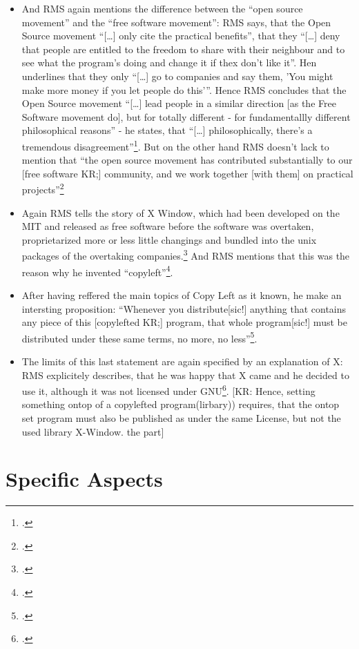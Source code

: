 \documentclass[DIV=calc,BCOR=5mm,11pt,headings=small,oneside,abstract=true, toc=bib]{scrartcl}
\begin{document}
\begin{itemize}
  \item And RMS again mentions the difference between the \enquote{open
  source movement} and the \enquote{free software movement}: RMS says,
  that the Open Source movement \enquote{[\ldots] only cite the practical
  benefits}, that they \enquote{[\ldots] deny that people are
  entitled to the freedom to share with their neighbour and to see what
  the program's doing and change it if thex don't like it}. Hen underlines
  that they only \enquote{[\ldots] go to companies and say them, 'You might
  make more money if you let people do this'}. Hence RMS concludes that
  the Open Source movement \enquote{[\ldots] lead people in a similar direction
  [as the Free Software movement do], but for totally different - for
  fundamentallly different philosophical reasons} - he states, that
  \enquote{[\ldots] philosophically, there's a tremendous
  disagreement}\footcite[cf][167]{Stallman2001a}. But on the other hand
  RMS doesn't lack to mention that \enquote{the open source movement has
  contributed substantially to our [free software KR;] community, and we work
  together [with them] on practical
  projects}\footcite[cf][167]{Stallman2001a}
  \item Again RMS tells the story of X Window, which had been developed on the
  MIT and released as free software before the software was overtaken,
  proprietarized more or less little changings and bundled into the unix
  packages of the overtaking companies.\footcite[cf][168f]{Stallman2001a} And
  RMS mentions that this was the reason why he invented 
  \enquote{copyleft}\footcite[cf][169]{Stallman2001a}.
  \item After having reffered the main topics of Copy Left as it known, he make
  an intersting proposition: \enquote{Whenever you distribute[sic!]
  anything that contains any piece of this [copylefted KR;] program, that
  whole program[sic!] must be distributed under these same terms, no
  more, no less}\footcite[cf][169]{Stallman2001a}.
  \item The limits of this last statement are again specified by an explanation
  of X: RMS explicitely describes, that he was happy that X came and he decided
  to use it, although it was not licensed under
  GNU\footcite[cf][171]{Stallman2001a}. [KR: Hence, setting something ontop of a
  copylefted program(lirbary)) requires, that the ontop set program must also be
  published as under the same License, but not the used library X-Window. the
  part]
\end{itemize}


\section{Specific Aspects}

\small

\end{document}
